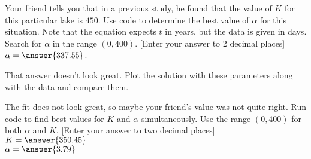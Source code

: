\documentclass{ximera}
\begin{document}
\begin{exercise}
    Your friend tells you that in a previous study, he found that the value of $K$ for this particular lake is $450$. Use code to determine the best value of $\alpha$ for this situation. Note that the equation expects $t$ in years, but the data is given in days. Search for $\alpha$ in the range $(0, 400)$. [Enter your answer to 2 decimal places] $\alpha = \answer{337.55}$.
    \begin{feedback}[correct]
        That answer doesn't look great. Plot the solution with these parameters along with the data and compare them. 
    \end{feedback}
    \begin{problem}
        The fit does not look great, so maybe your friend's value was not quite right. Run code to find best values for $K$ and $\alpha$ simultaneously. Use the range $(0, 400)$ for both $\alpha$ and $K$. [Enter your answer to two decimal places]\\
        $K = \answer{350.45}$\\
        $\alpha = \answer{3.79}$
    \end{problem}

\end{exercise}
\end{document}
